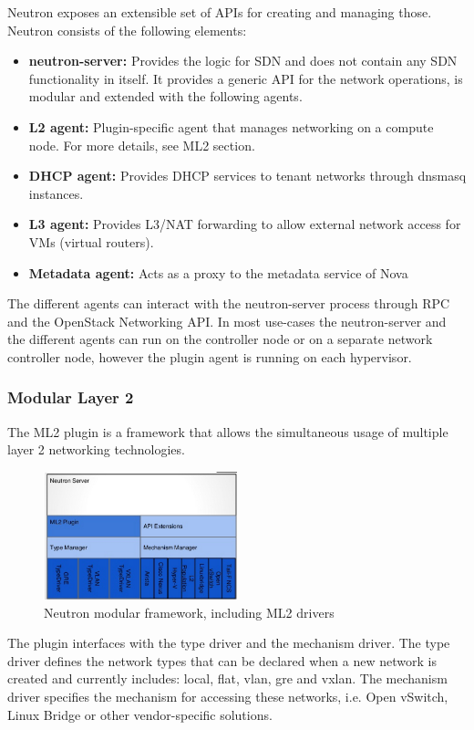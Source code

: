 Neutron exposes an extensible set of APIs for creating and managing those. Neutron consists of the following elements:
\begin{itemize}
\item \textbf{neutron-server:} Provides the logic for SDN and does not contain any SDN functionality in itself. It provides a generic API for the network operations, is modular and extended with the following agents.
\item \textbf{L2 agent:} Plugin-specific agent that manages networking on a compute node. For more details, see ML2 section.
\item \textbf{DHCP agent:} Provides DHCP services to tenant networks through dnsmasq instances.
\item \textbf{L3 agent:} Provides L3/NAT forwarding to allow external network access for VMs (virtual routers).
\item \textbf{Metadata agent:} Acts as a proxy to the metadata service of Nova
\end{itemize}

The different agents can interact with the neutron-server process through RPC and the OpenStack Networking API. In most use-cases the neutron-server and the different agents can run on the controller node or on a separate network controller node, however the plugin agent is running on each hypervisor.


\subsubsection{Modular Layer 2}

The ML2 plugin is a framework that allows the simultaneous usage of multiple layer 2 networking technologies.

\begin{figure}[H]
\centering
\includegraphics[width=0.5\textwidth]{images/fundamentals/neutron_ml2.png}
\caption{Neutron modular framework, including ML2 drivers}
\end{figure}

The plugin interfaces with the type driver and the mechanism driver. The type driver defines the network types that can be declared when a new network is created and currently includes: local, flat, vlan, gre and vxlan. The mechanism driver specifies the mechanism for accessing these networks, i.e. Open vSwitch, Linux Bridge or other vendor-specific solutions. 



